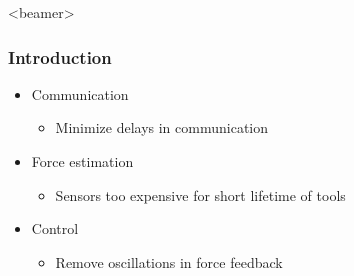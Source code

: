 \begin{frame}<beamer>
\frametitle{Introduction}
\begin{itemize}
\item Communication
\begin{itemize}
\item Minimize delays in communication
\end{itemize}
\item Force estimation
\begin{itemize}
\item Sensors too expensive for short lifetime of tools
\end{itemize}
\item Control
\begin{itemize}
\item Remove oscillations in force feedback
\end{itemize}
\end{itemize}
\end{frame}